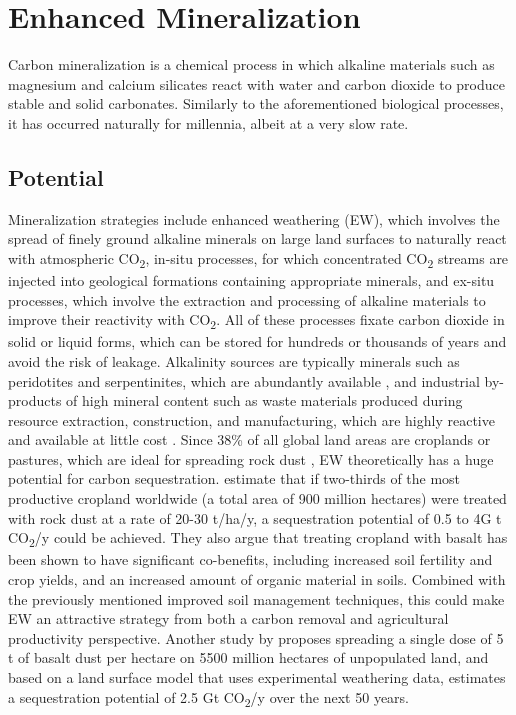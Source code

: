 \section{Enhanced Mineralization}
Carbon mineralization is a chemical process in which alkaline materials such as magnesium and calcium silicates react with water and carbon dioxide to produce stable and solid carbonates. Similarly to the aforementioned biological processes, it has occurred naturally for millennia, albeit at a very slow rate.
\subsection*{Potential}
Mineralization strategies include enhanced weathering (EW), which involves the spread of finely ground alkaline minerals on large land surfaces to naturally react with atmospheric CO\textsubscript{2}, in-situ processes, for which concentrated CO\textsubscript{2} streams are injected into geological formations containing appropriate minerals, and ex-situ processes, which involve the extraction and processing of alkaline materials to improve their reactivity with CO\textsubscript{2}. All of these processes fixate carbon dioxide in solid or liquid forms, which can be stored for hundreds or thousands of years and avoid the risk of leakage. Alkalinity sources are typically minerals such as peridotites and serpentinites, which are abundantly available \parencite{Lackner1997ProgressSubstrates}, and industrial by-products of high mineral content such as waste materials produced during resource extraction, construction, and manufacturing, which are highly reactive and available at little cost \parencite[51]{NRC2015ClimateSequestration}.
Since 38\% of all global land areas are croplands or pastures, which are ideal for spreading rock dust \parencite{Almaraz2022MethodsSettings}, EW theoretically has a huge potential for carbon sequestration. \textcite{Beerling2018FarmingSecurity} estimate that if two-thirds of the most productive cropland worldwide (a total area of 900 million hectares) were treated with rock dust at a rate of 20-30 t/ha/y, a sequestration potential of 0.5 to 4G t CO\textsubscript{2}/y could be achieved. They also argue that treating cropland with basalt has been shown to have significant co-benefits, including increased soil fertility and crop yields, and an increased amount of organic material in soils. Combined with the previously mentioned improved soil management techniques, this could make EW an attractive strategy from both a carbon removal and agricultural productivity perspective. Another study by \textcite{Goll2021PotentialRock} proposes spreading a single dose of 5 t of basalt dust per hectare on 5500 million hectares of unpopulated land, and based on a land surface model that uses experimental weathering data, estimates a sequestration potential of 2.5 Gt CO\textsubscript{2}/y over the next 50 years.\\
